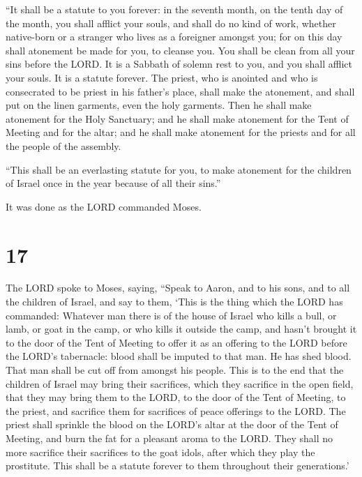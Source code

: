  ``It shall be a statute to you forever: in the seventh
month, on the tenth day of the month, you shall afflict your souls, and
shall do no kind of work, whether native-born or a stranger who lives as
a foreigner amongst you;  for on this day shall atonement
be made for you, to cleanse you. You shall be clean from all your sins
before the LORD.  It is a Sabbath of solemn rest to you,
and you shall afflict your souls. It is a statute forever. 
The priest, who is anointed and who is consecrated to be priest in his
father's place, shall make the atonement, and shall put on the linen
garments, even the holy garments.  Then he shall make
atonement for the Holy Sanctuary; and he shall make atonement for the
Tent of Meeting and for the altar; and he shall make atonement for the
priests and for all the people of the assembly.

 ``This shall be an everlasting statute for you, to make
atonement for the children of Israel once in the year because of all
their sins.''

It was done as the LORD commanded Moses.

\hypertarget{section-16}{%
\section{17}\label{section-16}}

 The LORD spoke to Moses, saying,  ``Speak to
Aaron, and to his sons, and to all the children of Israel, and say to
them, `This is the thing which the LORD has commanded: 
Whatever man there is of the house of Israel who kills a bull, or lamb,
or goat in the camp, or who kills it outside the camp,  and
hasn't brought it to the door of the Tent of Meeting to offer it as an
offering to the LORD before the LORD's tabernacle: blood shall be
imputed to that man. He has shed blood. That man shall be cut off from
amongst his people.  This is to the end that the children of
Israel may bring their sacrifices, which they sacrifice in the open
field, that they may bring them to the LORD, to the door of the Tent of
Meeting, to the priest, and sacrifice them for sacrifices of peace
offerings to the LORD.  The priest shall sprinkle the blood
on the LORD's altar at the door of the Tent of Meeting, and burn the fat
for a pleasant aroma to the LORD.  They shall no more
sacrifice their sacrifices to the goat idols, after which they play the
prostitute. This shall be a statute forever to them throughout their
generations.'

